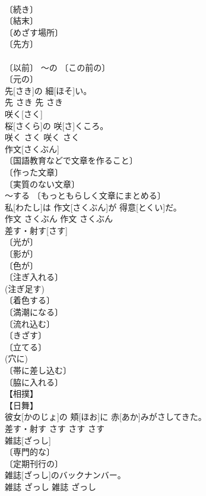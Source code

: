 \documentclass[8pt]{extreport}
\begin{document}
\begin{CJK}{UTF8}{min}
\\	〔続き〕 
\\	〔結末〕 
\\	〔めざす場所〕 
\\	〔先方〕 
\\	[⇒さきさま] 
\\	〔以前〕 ～の 〔この前の〕 
\\	〔元の〕 
\\	先[さき]の 細[ほそ]い。	
\\	先	さき	先	さき	
\\	咲く[さく]	
\\	[⇒さかせる]	桜[さくら]の 咲[さ]くころ。	
\\	咲く	さく	咲く	さく	
\\	作文[さくぶん]	
\\	〔国語教育などで文章を作ること〕 
\\	〔作った文章〕 
\\	〔実質のない文章〕 
\\	～する 〔もっともらしく文章にまとめる〕 
\\	私[わたし]は 作文[さくぶん]が 得意[とくい]だ。	
\\	作文	さくぶん	作文	さくぶん	
\\	差す・射す[さす]	
\\	〔光が〕 
\\	〔影が〕 
\\	〔色が〕 
\\	〔注ぎ入れる〕 
\\	(注ぎ足す) 
\\	〔着色する〕 
\\	〔満潮になる〕 
\\	〔流れ込む〕 
\\	〔きざす〕 
\\	〔立てる〕 
\\	(穴に) 
\\	〔帯に差し込む〕 
\\	〔脇に入れる〕 
\\	【相撲】 
\\	【日舞】 
\\	彼女[かのじょ]の 頬[ほお]に 赤[あか]みがさしてきた。	
\\	差す・射す	さす	さす	さす	
\\	雑誌[ざっし]	
\\	〔専門的な〕 
\\	〔定期刊行の〕 
\\	雑誌[ざっし]のバックナンバー。	
\\	雑誌	ざっし	雑誌	ざっし	

\end{CJK}
\end{document}
